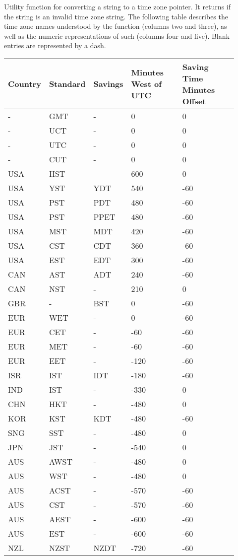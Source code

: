 \begin{description}
\item[\small{}]
Utility function for converting a \C{} string to a time zone pointer.
It returns  if the string is an invalid time zone string.
The following table describes the time zone names understood by the 
 function (columns two and three), as well as the
numeric representations of such (columns four and five).
Blank entries are represented by a dash.

\begin{tabular}{|l|l|l|l|l|}
\hline
Country & Standard & Savings & Minutes West of UTC & Saving Time Minutes Offset\\\hline
  - & GMT &   - &   0 &   0\\\hline
  - & UCT &   - &   0 &   0\\\hline
  - & UTC &   - &   0 &   0\\\hline
  - & CUT &   - &   0 &   0\\\hline
USA & HST &   - & 600 &   0\\\hline
USA & YST & YDT & 540 & -60\\\hline
USA & PST & PDT & 480 & -60\\\hline
USA & PST & PPET & 480 & -60\\\hline
USA & MST & MDT & 420 & -60\\\hline
USA & CST & CDT & 360 & -60\\\hline
USA & EST & EDT & 300 & -60\\\hline
CAN & AST & ADT & 240 & -60\\\hline
CAN & NST &   - & 210 &   0\\\hline
GBR &  -  & BST &   0 & -60\\\hline
EUR & WET &   - &   0 & -60\\\hline
EUR & CET &   - & -60 & -60\\\hline
EUR & MET &   - & -60 & -60\\\hline
EUR & EET &   - & -120 & -60\\\hline
ISR & IST & IDT & -180 & -60\\\hline
IND & IST &   - & -330 &   0\\\hline
CHN & HKT &   - & -480 &   0\\\hline
KOR & KST & KDT & -480 & -60\\\hline
SNG & SST &   - & -480 &   0\\\hline
JPN & JST &   - & -540 &   0\\\hline
AUS & AWST &   -& -480 &   0\\\hline
AUS & WST  &  - & -480 &   0\\\hline
AUS & ACST &   -&  -570 & -60\\\hline
AUS & CST &   - & -570 & -60\\\hline
AUS & AEST &   -&  -600&  -60\\\hline
AUS & EST &   - & -600 & -60\\\hline
NZL & NZST & NZDT & -720 & -60\\\hline
\hline
\end{tabular}


\end{description}
